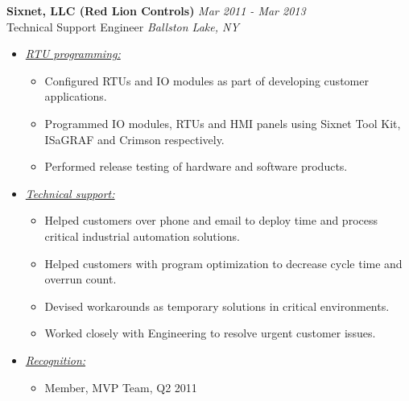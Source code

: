 \documentclass{article}
\begin{document}
    {\bf Sixnet, LLC (Red Lion Controls)} \hfill {\em Mar 2011 - Mar 2013} \\
    Technical Support Engineer \hfill {\em Ballston Lake, NY} \\
    \begin{itemize}
    \item \underline{\it RTU programming:}
          \begin{itemize}
          \item Configured RTUs and IO modules as part of developing customer
                applications.
          \item Programmed IO modules, RTUs and HMI panels using Sixnet Tool
                Kit, ISaGRAF and Crimson respectively.
          \item Performed release testing of hardware and software products.
          \end{itemize}
    \item \underline{\it Technical support:}
          \begin{itemize}
          \item Helped customers over phone and email to deploy time and process
                critical industrial automation solutions.
          \item Helped customers with program optimization to decrease cycle
                time and overrun count.
          \item Devised workarounds as temporary solutions in critical
                environments.
          \item Worked closely with Engineering to resolve urgent customer
                issues.
          \end{itemize}
    \item \underline{\it Recognition:}
          \begin{itemize}
          \item Member, MVP Team, Q2 2011
          \end{itemize}
    \end{itemize}
    \bigskip
\end{document}
